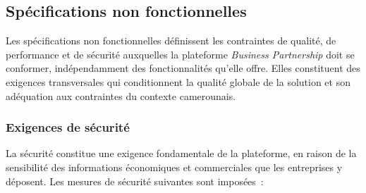 \documentclass[12pt, a4paper, oneside]{report}
\begin{document}
	\subsection{Spécifications non fonctionnelles}
	Les spécifications non fonctionnelles définissent les contraintes
	de qualité, de performance et de sécurité auxquelles la plateforme
	\textit{Business Partnership} doit se conformer, indépendamment
	des fonctionnalités qu'elle offre. Elles constituent des exigences
	transversales qui conditionnent la qualité globale de la solution
	et son adéquation aux contraintes du contexte camerounais.
	
	
	
	\subsubsection{Exigences de sécurité}
	
	La sécurité constitue une exigence fondamentale de la plateforme,
	en raison de la sensibilité des informations économiques et
	commerciales que les entreprises y déposent. Les mesures de
	sécurité suivantes sont imposées~:
	
\end{document}
